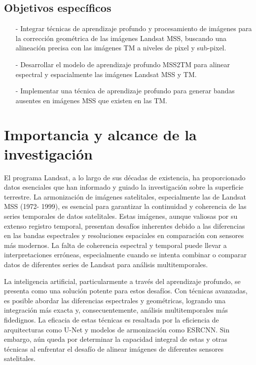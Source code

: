             \subsection{Objetivos específicos}
                \begin{itemize}
                    \item[-] Integrar técnicas de aprendizaje profundo y procesamiento de imágenes para la corrección geométrica de las imágenes Landsat MSS, buscando una alineación precisa con las imágenes TM a niveles de pixel y sub-pixel.
                    \item[-] Desarrollar el modelo de aprendizaje profundo MSS2TM para alinear espectral y espacialmente las imágenes Landsat MSS y TM.
                    \item[-] Implementar una técnica de aprendizaje profundo para generar bandas ausentes en imágenes MSS que existen en las TM.
                \end{itemize}

    \section{Importancia y alcance de la investigación}
        El programa Landsat, a lo largo de sus décadas de existencia, ha proporcionado datos esenciales que han informado y guiado la investigación sobre la superficie terrestre. La armonización de imágenes satelitales, especialmente las de Landsat MSS (1972- 1999), es esencial para garantizar la continuidad y coherencia de las series temporales de datos satelitales. Estas imágenes, aunque valiosas por su extenso registro temporal, presentan desafíos inherentes debido a las diferencias en las bandas espectrales y resoluciones espaciales en comparación con sensores más modernos. La falta de coherencia espectral y temporal puede llevar a interpretaciones erróneas, especialmente cuando se intenta combinar o comparar datos de diferentes series de Landsat para análisis multitemporales.
        
        La inteligencia artificial, particularmente a través del aprendizaje profundo, se presenta como una solución potente para estos desafíos. Con técnicas avanzadas, es posible abordar las diferencias espectrales y geométricas, logrando una integración más exacta y, consecuentemente, análisis multitemporales más fidedignos. La eficacia de estas técnicas es resaltada por la eficiencia de arquitecturas como U-Net y modelos de armonización como ESRCNN. Sin embargo, aún queda por determinar la capacidad integral de estas y otras técnicas al enfrentar el desafío de alinear imágenes de diferentes sensores satelitales.
        

